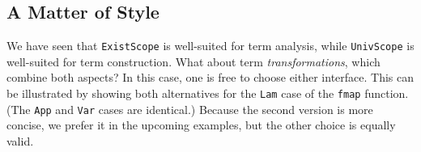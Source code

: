 \documentclass[9pt,authoryear]{sigplanconf}
\begin{document}
\subsection{A Matter of Style\label{styleSec}}

%
We have seen that \texttt{ExistScope} is well-suited for term analysis,
    while \texttt{UnivScope} is well-suited for term construction. What
    about term \emph{transformations}, which combine both aspects?
    In this case, one is free to choose either interface. This can be
    illustrated by showing both alternatives for the \texttt{Lam} case of the
    \texttt{fmap} function. (The \texttt{App} and \texttt{Var} cases are identical.)
    Because the second version is more concise, we prefer it in the
    upcoming examples, but the other choice is equally valid.%


%
%


{\nopagebreak }
\end{document}

